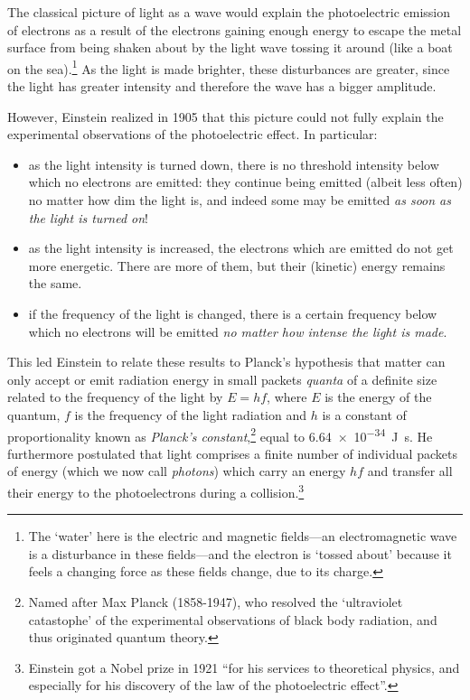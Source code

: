 The classical picture of light as a wave would explain the photoelectric emission of electrons as a result of the electrons gaining enough energy to escape the metal surface from being shaken about by the light wave tossing it around (like a boat on the sea).\footnote{The `water' here is the electric and magnetic fields---an electromagnetic wave is a disturbance in these fields---and the electron is `tossed about' because it feels a changing force as these fields change, due to its charge.}  As the light is made brighter, these disturbances are greater, since the light has greater intensity and therefore the wave has a bigger amplitude.

However, Einstein realized in 1905 that this picture could not fully explain the experimental observations of the photoelectric effect.  In particular:
\begin{itemize}
\item as the light intensity is turned down, there is no threshold intensity below which no electrons are emitted: they continue being emitted (albeit less often) no matter how dim the light is, and indeed some may be emitted \emph{as soon as the light is turned on}!
\item as the light intensity is increased, the electrons which are emitted do not get more energetic.  There are more of them, but their (kinetic) energy remains the same.
\item if the frequency of the light is changed, there is a certain frequency below which no electrons will be emitted \emph{no matter how intense the light is made}.
\end{itemize}

This led Einstein to relate these results to Planck's hypothesis that matter can only accept or emit radiation energy in small packets \emph{quanta} of a definite size related to the frequency of the light by $E=hf$, where $E$ is the energy of the quantum, $f$ is the frequency of the light radiation and $h$ is a constant of proportionality known as \emph{Planck's constant},\footnote{Named after Max Planck (1858-1947), who resolved the `ultraviolet catastophe' of the experimental observations of black body radiation, and thus originated quantum theory.} equal to \SI{6.64e-34}{J.s}. He furthermore postulated that light comprises a finite number of individual packets of energy (which we now call \emph{photons}) which carry an energy $hf$ and transfer all their energy to the photoelectrons during a collision.\footnote{Einstein got a Nobel prize in 1921 ``for his services to theoretical physics, and especially for his discovery of the law of the photoelectric effect''.}

